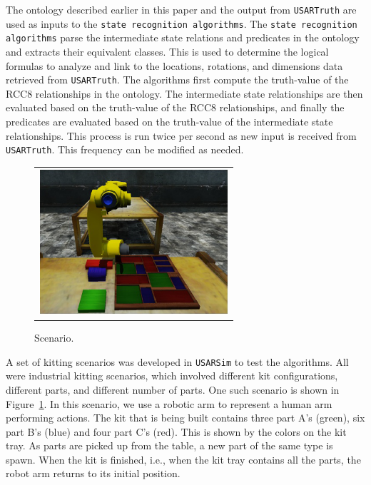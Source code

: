 \documentclass[preprint,12pt]{elsarticle}
\begin{document}
The ontology described earlier in this paper and the output from \texttt{USARTruth} are used as inputs to the \texttt{state recognition algorithms}. The \texttt{state recognition algorithms} parse the intermediate state relations and predicates in the ontology and extracts their equivalent classes. This is used to determine the logical formulas to analyze and link to the locations, rotations, and dimensions data retrieved from \texttt{USARTruth}. The algorithms first compute the truth-value of the RCC8 relationships in the ontology. The intermediate state relationships are then evaluated based on the truth-value of the RCC8 relationships, and finally the predicates are evaluated based on the truth-value of the intermediate state relationships. This process is run twice per second as new input is received from \texttt{USARTruth}. This frequency can be modified as needed.

\begin{figure}[t!h!]
\begin{center}
\begin{tabular}{c}
\includegraphics[width=7cm]{simulation.eps}
\end{tabular}
\end{center}
\caption{Scenario.}
\label{fig:scenario}
\end{figure}

A set of kitting scenarios was developed in \texttt{USARSim} to test the algorithms. All were industrial kitting scenarios, which involved different kit configurations, different parts, and different number of parts. One such scenario is shown in Figure~\ref{fig:scenario}. In this scenario, we use a robotic arm to represent a human arm performing actions. The kit that is being built contains three part A's (green), six part B's (blue) and four part C's (red). This is shown by the colors on the kit tray. As parts are picked up from the table, a new part of the same type is spawn. When the kit is finished, i.e., when the kit tray contains all the parts, the robot arm returns to its initial position.
\end{document}
